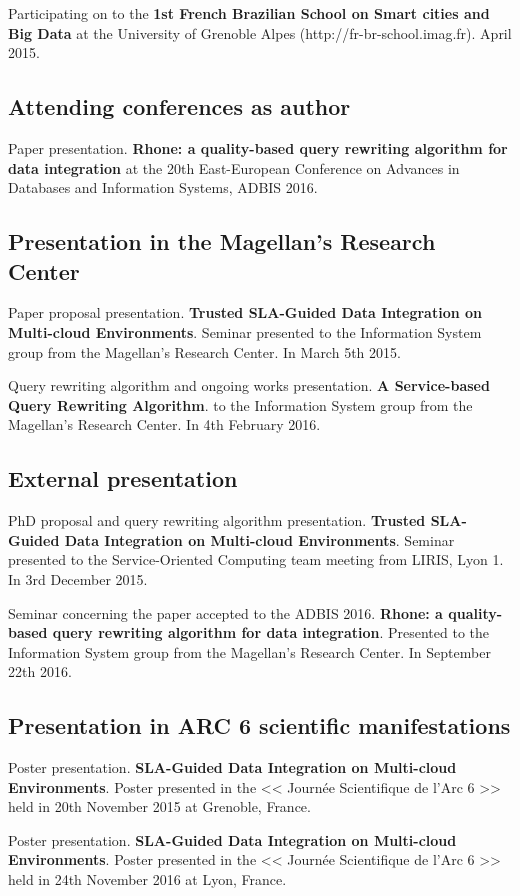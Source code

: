 \noindent
Participating on to the \textbf{1st French Brazilian School on Smart cities and Big Data} at the
University of Grenoble Alpes (http://fr-br-school.imag.fr). April 2015.

\subsection{Attending conferences as author}
\noindent
Paper presentation. \textbf{Rhone: a quality-based query rewriting algorithm for data integration} at the 20th East-European Conference on Advances in Databases and Information Systems, ADBIS 2016.

\subsection{Presentation in the Magellan's Research Center}
\noindent
Paper proposal presentation. \textbf{Trusted SLA-Guided Data Integration on Multi-cloud Environments}. Seminar presented to the Information System group from the Magellan's Research Center. In March 5th 2015.

\bigskip
\noindent
Query rewriting algorithm and ongoing works presentation. \textbf{A Service-based Query Rewriting Algorithm}. to the Information System group from the Magellan's Research Center. In 4th February 2016.

\subsection{External presentation}
\noindent
PhD proposal and query rewriting algorithm presentation. \textbf{Trusted SLA-Guided Data Integration on Multi-cloud Environments}. Seminar presented to the Service-Oriented Computing team meeting from LIRIS, Lyon 1. In 3rd December 2015.

\bigskip
\noindent
Seminar concerning the paper accepted to the ADBIS 2016. \textbf{Rhone: a quality-based query rewriting algorithm for data integration}. Presented to the Information System group from the Magellan's Research Center. In September 22th 2016.

\subsection{Presentation in ARC 6 scientific manifestations}

\noindent
Poster presentation. \textbf{SLA-Guided Data Integration on Multi-cloud Environments}. Poster presented in the << Journ\'ee Scientifique de l'Arc 6 >> held in 20th November 2015 at Grenoble, France. 

\bigskip
\noindent
Poster presentation. \textbf{SLA-Guided Data Integration on Multi-cloud Environments}. Poster presented in the << Journ\'ee Scientifique de l'Arc 6 >> held in 24th November 2016 at Lyon, France.